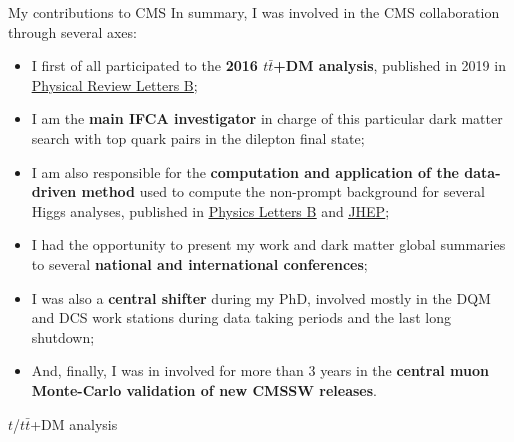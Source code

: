 \documentclass[8pt]{beamer}
\begin{document}
\begin{frame}{My contributions to CMS}
\justifying
In summary, \alert{I was involved in the CMS collaboration} through several axes:
\begin{itemize}
\justifying
\item I first of all participated to the \textbf{2016 $t \bar t$+DM analysis}, published in 2019 in \href{https://journals.aps.org/prl/abstract/10.1103/PhysRevLett.122.011803}{\underline{Physical Review Letters B}};
\item I am the \textbf{main IFCA investigator} in charge of this particular dark matter search with top quark pairs in the dilepton final state;
\item I am also responsible for the \textbf{computation and application of the data-driven method} used to compute the non-prompt background for several Higgs analyses, published in \href{https://research.monash.edu/en/publications/measurements-of-properties-of-the-higgs-boson-decaying-to-a-w-bos}{\underline{Physics Letters B}} and \href{https://arxiv.org/abs/2007.01984}{\underline{JHEP}};
\item I had the opportunity to present my work and dark matter global summaries to several \textbf{national and international conferences};
\item I was also a \textbf{central shifter} during my PhD, involved mostly in the DQM and DCS work stations during data taking periods and the last long shutdown;
\item And, finally, I was in involved for more than 3 years in the \textbf{central muon Monte-Carlo validation of new CMSSW releases}.
\end{itemize}
\end{frame}


\begin{frame}[standout]
$t$/$t \bar t$+DM analysis
\end{frame}
\end{document}
